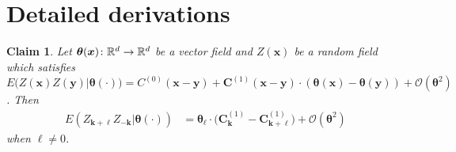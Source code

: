\documentclass[10pt,noinfoline]{imsart}
\newtheorem{claim}{Claim}
\newcommand{\bs}{\boldsymbol}
\begin{document}
%
%









%
%

\appendix




%
%
\section{Detailed derivations}\label{section: Detailed Proofs}





%
%

\begin{claim}
\label{claim: first order expansion}
Let $\bs\theta(\bs x)\colon \Bbb R^d \rightarrow \Bbb R^d$ be a vector field and $Z(\bs x)$ be a random field which satisfies
$E\big(Z(\bs x)Z(\bs y)|\bs \theta(\cdot)\big)= C^{(0)}(\bs x-
\bs y) + \bs C^{(1)}(\bs x-\bs y)\cdot(\bs\theta(\bs x)-\bs\theta(\bs y)) +  \mathcal O(\bs\theta^2)$. Then 
\begin{align}
\label{eq in claim: first order expansion}
E(Z_{\bs k+\bs \ell}Z_{-\bs k}|\bs \theta(\cdot)) &= \bs\theta_{\bs \ell}\cdot\big(\bs C^{(1)}_{\bs k} - \bs C_{\bs k+\bs \ell}^{(1)}\big) + \mathcal O(\bs\theta^2)
\end{align}
when $\bs\ell\neq 0$.
\end{claim}
\end{document}
